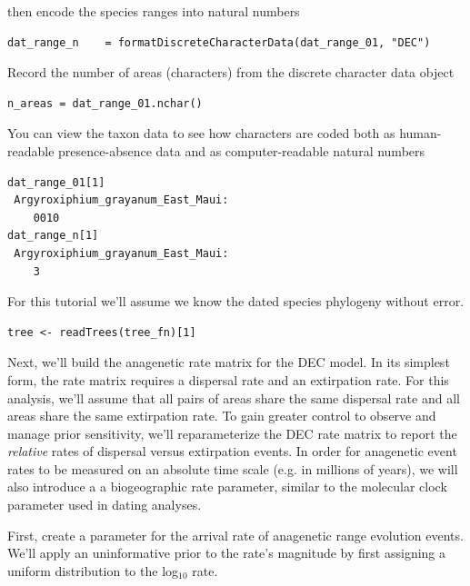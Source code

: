 then encode the species ranges into natural numbers

\begin{snugshade}
\begin{lstlisting}
dat_range_n    = formatDiscreteCharacterData(dat_range_01, "DEC")
\end{lstlisting}
\end{snugshade}


Record the number of areas (characters) from the discrete character data object

\begin{snugshade}
\begin{lstlisting}
n_areas = dat_range_01.nchar()
\end{lstlisting}
\end{snugshade}

You can view the taxon data to see how characters are coded both as human-readable presence-absence data and as computer-readable natural numbers
\begin{snugshade}
\begin{lstlisting}
dat_range_01[1]
 Argyroxiphium_grayanum_East_Maui:
    0010
dat_range_n[1]
 Argyroxiphium_grayanum_East_Maui:
    3
\end{lstlisting}
\end{snugshade}

For this tutorial we'll assume we know the dated species phylogeny without error.

\begin{snugshade}
\begin{lstlisting}
tree <- readTrees(tree_fn)[1]
\end{lstlisting}
\end{snugshade}

Next, we'll build the anagenetic rate matrix for the DEC model.
In its simplest form, the rate matrix requires a dispersal rate and an extirpation rate.
For this analysis, we'll assume that all pairs of areas share the same dispersal rate and all areas share the same extirpation rate.
To gain greater control to observe and manage prior sensitivity, we'll reparameterize the DEC rate matrix to report the {\it relative} rates of dispersal versus extirpation events.
In order for anagenetic event rates to be measured on an absolute time scale (e.g. in millions of years), we will also introduce a a biogeographic rate parameter, similar to the molecular clock parameter used in dating analyses.

First, create a parameter for the arrival rate of anagenetic range evolution events.
We'll apply an uninformative prior to the rate's magnitude by first assigning a uniform distribution to the log$_{10}$ rate.

